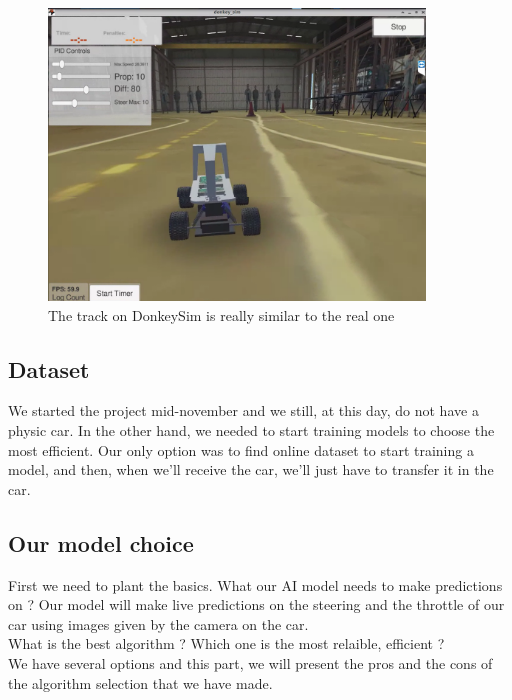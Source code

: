 \begin{figure}[!h]
\centering
\includegraphics[width=10cm]{img/track.png}
\caption{The track on DonkeySim is really similar to the real one}
\end{figure}
\clearpage

\subsection{Dataset}

We started the project mid-november and we still, at this day, do not have a physic car. In the other hand, we needed to start training models to choose the most efficient. Our only option was to find online dataset to start training a model, and then, when we'll receive the car, we'll just have to transfer it in the car.\\





\subsection{Our model choice}

First we need to plant the basics. What our AI model needs to make predictions on ? Our model will make live predictions on the steering and the throttle of our car using images given by the camera on the car.\\

What is the best algorithm ? Which one is the most relaible, efficient ?\\

We have several options and this part, we will present the pros and the cons of the algorithm selection that we have made.\\

